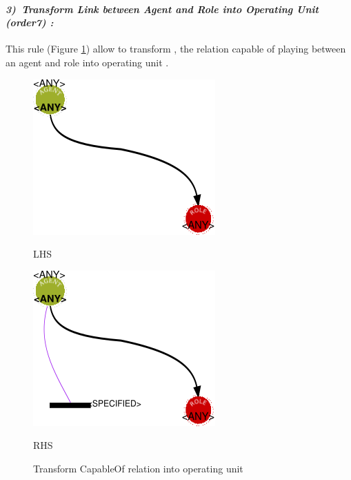 \paragraph{\emph{3)~Transform Link between Agent and Role into Operating Unit (order7) :} }
 
 
This rule (Figure \ref{fig:Operating Unit for every link capable of playing}) allow to transform , the relation capable of playing between an agent and role  into operating unit .
\vspace{1cm}
\begin{figure}[th]
\centering
\begin{minipage}{.6\textwidth} 
  \includegraphics[width=.7\linewidth]{Chapiter3/img/L3}
  \linebreak  

\hspace{2.5cm}
  LHS 
  
\end{minipage}%
\begin{minipage}{.6\textwidth} 
  \includegraphics[width=.7\linewidth]{Chapiter3/img/R3}
  \linebreak  

\hspace{2.5cm}
  RHS  
\end{minipage}
\caption{\label{fig:Operating Unit for every link capable of playing}Transform CapableOf relation into operating unit} 
\end{figure}


